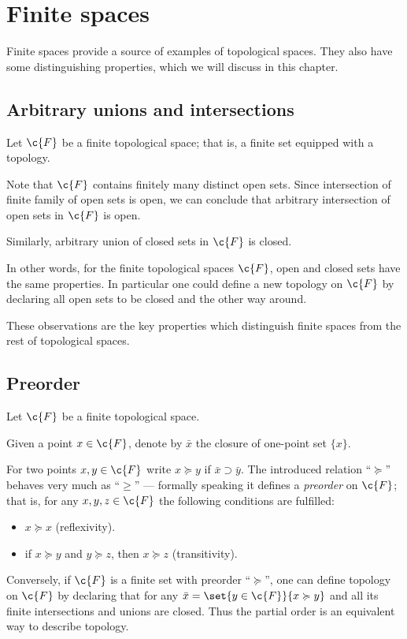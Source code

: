 \chapter{Finite spaces}

Finite spaces provide a source of examples of topological spaces.
They also have some distinguishing properties, which we will discuss in this chapter.

\section{Arbitrary unions and intersections}

Let $\c{F}$ be a finite topological space;
that is, a finite set equipped with a topology.

Note that $\c{F}$ contains finitely many distinct open sets.
Since intersection of finite family of open sets is open,
we can conclude that arbitrary intersection of open sets in $\c{F}$ is open.

Similarly, arbitrary union of closed sets in $\c{F}$ is closed.

In other words, for the finite topological spaces $\c{F}$, open and closed sets have the same properties.
In particular one could define a new topology on $\c{F}$ by declaring all open sets to be closed and the other way around.

These observations are the key properties which distinguish finite spaces from the rest of topological spaces.

\section{Preorder}

Let $\c{F}$ be a finite topological space.

Given a point $x\in \c{F}$,
denote by $\bar x$ the closure of one-point set $\{x\}$.

For two points $x,y\in \c{F}$ write $x\succcurlyeq y$ if $\bar x\supset \bar y$.
The introduced relation ``$\succcurlyeq$'' behaves very much as ``$\ge$'' --- formally speaking it defines a \emph{preorder} on $\c{F}$;
that is, for any $x,y,z\in\c{F}$ the following conditions are fulfilled: 
\begin{itemize}
\item $x\succcurlyeq x$ (reflexivity).
\item if $x\succcurlyeq y$ and $y\succcurlyeq z$, then $x\succcurlyeq z$ (transitivity).
\end{itemize}

Conversely, if $\c{F}$ is a finite set with preorder ``$\succcurlyeq$'',
one can define topology on $\c{F}$ by declaring that for any $\bar x=\set{y\in \c{F}}{x\succcurlyeq y}$ and all its finite intersections and unions are closed.
Thus the partial order is an equivalent way to describe topology.




